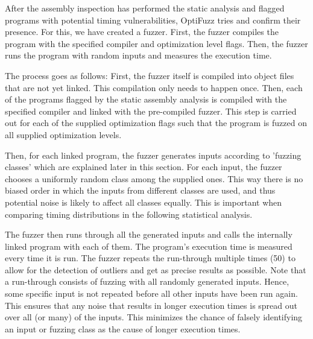After the assembly inspection has performed the static analysis and flagged programs with potential timing vulnerabilities, OptiFuzz tries and confirm their presence. 
For this, we have created a fuzzer. 
First, the fuzzer compiles the program with the specified compiler and optimization level flags.
Then, the fuzzer runs the program with random inputs and measures the execution time.

The process goes as follows: 
First, the fuzzer itself is compiled into object files that are not yet linked. 
This compilation only needs to happen once. 
Then, each of the programs flagged by the static assembly analysis is compiled with the specified compiler and linked with the pre-compiled fuzzer. 
This step is carried out for each of the supplied optimization flags such that the program is fuzzed on all supplied optimization levels.

Then, for each linked program, the fuzzer generates inputs according to 'fuzzing classes' which are explained later in this section. 
For each input, the fuzzer chooses a uniformly random class among the supplied ones. 
This way there is no biased order in which the inputs from different classes are used, and thus potential noise is likely to affect all classes equally. 
This is important when comparing timing distributions in the following statistical analysis. 

The fuzzer then runs through all the generated inputs and calls the internally linked program with each of them. 
The program's execution time is measured every time it is run. 
The fuzzer repeats the run-through multiple times (50) to allow for the detection of outliers and get as precise results as possible. 
Note that a run-through consists of fuzzing with all randomly generated inputs.
Hence, some specific input is not repeated before all other inputs have been run again. 
This ensures that any noise that results in longer execution times is spread out over all (or many) of the inputs. 
This minimizes the chance of falsely identifying an input or fuzzing class as the cause of longer execution times.

